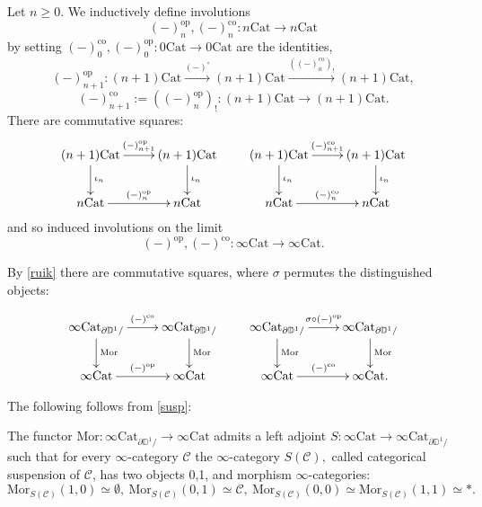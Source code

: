 \documentclass[10pt,oneside]{article}
\numberwithin{equation}{section} %
\numberwithin{figure}{section} %
\theoremstyle{plain}
\theoremstyle{definition}
\newcommand{\bD}{{\mathbb D}}
\newcommand{\mC}{{\mathcal C}}
\newcommand{\n}{{n}}
\newcommand{\op}{\mathrm{op}}
\newcommand{\co}{\mathrm{co}}
\newcommand{\Cat}{\mathrm{Cat}}
\newcommand{\Mor}{{\mathrm{Mor}}}
\begin{document}
\begin{definition}\label{ruik} Let $\n \geq 0.$
We inductively define involutions $$(-)^\op_\n, (-)^\co_\n: \n\Cat \to \n\Cat$$ by setting
$(-)^\co_0, (-)^\op_0:  0\Cat \to 0\Cat$ are the identities, $$(-)^\op_{\n+1}: {(\n+1)}\Cat \xrightarrow{(-)^\circ} {(\n+1)}\Cat \xrightarrow{((-)^\co_\n)_!}{(\n+1)}\Cat, $$ $$(-)^\co_{\n+1}:=((-)^\op_\n)_!: {(\n+1)}\Cat \xrightarrow{ }{(\n+1)}\Cat.$$
There are commutative squares:
$$\begin{xy}
\xymatrix{
{(\n+1)}\Cat \ar[d]^{\iota_\n}  \ar[r]^{(-)_{\n+1}^\op} & {(\n+1)}\Cat  \ar[d]^{\iota_\n}
\\ 
{\n}\Cat \ar[r]^{(-)_{\n}^\op} & {\n}\Cat
}
\end{xy}
\qquad
\begin{xy}
\xymatrix{
{(\n+1)}\Cat \ar[d]^{\iota_\n}  \ar[r]^{(-)_{\n+1}^\co} & {(\n+1)}\Cat  \ar[d]^{\iota_\n}
\\ 
{\n}\Cat \ar[r]^{(-)_{\n}^\co} & {\n}\Cat
}
\end{xy}
$$
and so induced involutions on the limit $$(-)^\op, (-)^\co: \infty\Cat \to \infty\Cat. $$

\end{definition}

\begin{remark}\label{oppo} By \cref{ruik} there are commutative squares, where $\sigma$ permutes the distinguished objects:

$$\begin{xy}
\xymatrix{
\infty\Cat_{\partial\bD^1/} \ar[d]^{\Mor}  \ar[r]^{(-)^\co} & \infty\Cat_{\partial\bD^1/}  \ar[d]^{\Mor}
\\ 
\infty\Cat \ar[r]^{(-)^\op} & \infty\Cat
}
\end{xy}\qquad
\begin{xy}
\xymatrix{
\infty\Cat_{\partial\bD^1/} \ar[d]^{\Mor}  \ar[r]^{\sigma \circ (-)^\op} & \infty\Cat_{\partial\bD^1/}  \ar[d]^{\Mor}
\\ 
\infty\Cat \ar[r]^{(-)^\co} & \infty\Cat.
}
\end{xy}
$$

\end{remark}

The following follows from \cref{susp}:

\begin{proposition}\label{suspi}

The functor $\Mor: \infty\Cat_{\partial\bD^1/} \to \infty\Cat$ admits a left adjoint
$S: \infty\Cat \to \infty\Cat_{\partial\bD^1/}$ such that for every $\infty$-category $\mC$ the $\infty$-category $S(\mC),$ called categorical suspension of $\mC$, has two objects 0,1, and morphism $\infty$-categories:
$$\Mor_{S(\mC)}(1,0)\simeq \emptyset, \ \Mor_{S(\mC)}(0,1)\simeq \mC, \ \Mor_{S(\mC)}(0,0)\simeq \Mor_{S(\mC)}(1,1) \simeq *.$$
    
\end{proposition}
\end{document}
